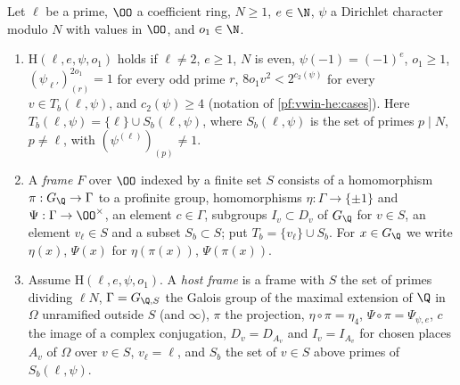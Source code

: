 \begin{definition}\label{pf:eis:frame}
Let $\ell$ be a prime, $\OO$ a coefficient ring, $N\ge1$, $e\in\N$, $\psi$ a Dirichlet character modulo $N$ with values in $\OO$, and
$o_1\in\N$.
\begin{enumerate}[label=(\alph*)]
\item $\mathrm{H}(\ell,e,\psi,o_1)$ holds if $\ell\ne2$, $e\ge1$, $N$ is even, $\psi(-1)=(-1)^e$, $o_1\ge1$, $(\psi_{\ell'})_{(r)}^{2o_1}=1$
  for every odd prime $r$, $8o_1v^2<2^{c_2(\psi)}$ for every $v\in T_b(\ell,\psi)$, and $c_2(\psi)\ge4$ (notation of \cref{pf:vwin-he:cases}).
  Here $T_b(\ell,\psi)=\{\ell\}\cup S_b(\ell,\psi)$, where $S_b(\ell,\psi)$ is the set of primes $p\mid N$, $p\ne\ell$, with
  $(\psi^{(\ell)})_{(p)}\ne1$.
\item A \emph{frame} $F$ over $\OO$ indexed by a finite set $S$ consists of a homomorphism $\pi:G_\Q\to\Gamma$ to a profinite group,
  homomorphisms $\eta:\Gamma\to\{\pm1\}$ and $\Psi:\Gamma\to\OO^\times$, an element $c\in\Gamma$, subgroups $I_v\subset D_v$ of $G_\Q$ for
  $v\in S$, an element $v_\ell\in S$ and a subset $S_b\subset S$; put $T_b=\{v_\ell\}\cup S_b$. For $x\in G_\Q$ we write $\eta(x)$,
  $\Psi(x)$ for $\eta(\pi(x))$, $\Psi(\pi(x))$.
\item Assume $\mathrm{H}(\ell,e,\psi,o_1)$. A \emph{host frame} is a frame with $S$ the set of primes dividing $\ell N$,
  $\Gamma=G_{\Q,S}$ the Galois group of the maximal extension of $\Q$ in $\Omega$ unramified outside $S$ (and $\infty$), $\pi$ the
  projection, $\eta\circ\pi=\eta_4$, $\Psi\circ\pi=\Psi_{\psi,e}$, $c$ the image of a complex conjugation, $D_v=D_{A_v}$ and $I_v=I_{A_v}$ for
  chosen places $A_v$ of $\Omega$ over $v\in S$, $v_\ell=\ell$, and $S_b$ the set of $v\in S$ above primes of $S_b(\ell,\psi)$.
\end{enumerate}
\end{definition}

